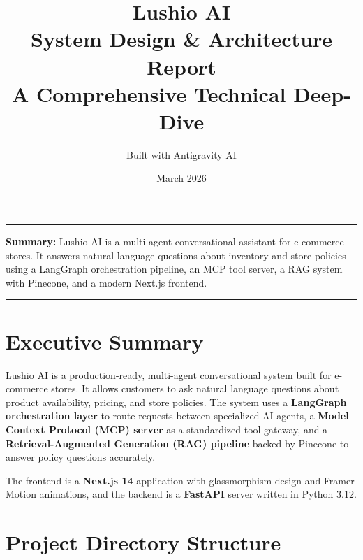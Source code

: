 \documentclass[12pt]{article}
\title{%
  {\huge\textbf{Lushio AI}}\\[8pt]
  {\Large System Design \& Architecture Report}\\[4pt]
  {\normalsize A Comprehensive Technical Deep-Dive}
}
\author{Built with Antigravity AI}
\date{March 2026}
\begin{document}
\maketitle
\vspace{1em}
\hrule
\vspace{0.5em}
\noindent\textbf{Summary:} Lushio AI is a multi-agent conversational assistant for e-commerce stores. It answers natural language questions about inventory and store policies using a LangGraph orchestration pipeline, an MCP tool server, a RAG system with Pinecone, and a modern Next.js frontend.
\vspace{0.5em}
\hrule
\vspace{1em}

\tableofcontents
\newpage

\section{Executive Summary}

Lushio AI is a production-ready, multi-agent conversational system built for e-commerce stores. It allows customers to ask natural language questions about product availability, pricing, and store policies. The system uses a \textbf{LangGraph orchestration layer} to route requests between specialized AI agents, a \textbf{Model Context Protocol (MCP) server} as a standardized tool gateway, and a \textbf{Retrieval-Augmented Generation (RAG) pipeline} backed by Pinecone to answer policy questions accurately.

The frontend is a \textbf{Next.js 14} application with glassmorphism design and Framer Motion animations, and the backend is a \textbf{FastAPI} server written in Python 3.12.

\section{Project Directory Structure}
\end{document}
